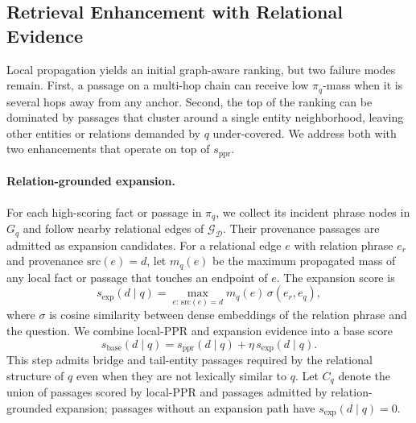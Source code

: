 \subsection{Retrieval Enhancement with Relational Evidence}
\label{sec:method:enhancement}

Local propagation yields an initial graph-aware ranking, but two failure
modes remain. First, a passage on a multi-hop chain can receive low
$\pi_q$-mass when it is several hops away from any anchor. Second, the
top of the ranking can be dominated by passages that cluster around a
single entity neighborhood, leaving other entities or relations demanded
by $q$ under-covered. We address both with two enhancements that operate
on top of $s_{\mathrm{ppr}}$.

\paragraph{Relation-grounded expansion.}
For each high-scoring fact or passage in $\pi_q$, we collect its
incident phrase nodes in $G_q$ and follow nearby relational edges of
$\mathcal{G}_{\mathcal{D}}$. Their provenance passages are admitted as
expansion candidates. For a relational edge $e$ with relation phrase
$e_r$ and provenance $\mathrm{src}(e)=d$, let $m_q(e)$ be the maximum
propagated mass of any local fact or passage that touches an endpoint of
$e$. The expansion score is
\begin{equation}
\label{eq:expansion-score}
s_{\mathrm{exp}}(d \mid q)
=
\max_{e:\,\mathrm{src}(e)=d}
m_q(e)\,\sigma(e_r,e_q),
\end{equation}
where $\sigma$ is cosine similarity between dense embeddings of the
relation phrase and the question. We combine local-PPR and expansion
evidence into a base score
\begin{equation}
\label{eq:base-score}
s_{\mathrm{base}}(d \mid q)
=
s_{\mathrm{ppr}}(d \mid q)
+
\eta\,s_{\mathrm{exp}}(d \mid q).
\end{equation}
This step admits bridge and tail-entity passages required by the
relational structure of $q$ even when they are not lexically similar to
$q$. Let $C_q$ denote the union of passages scored by local-PPR and
passages admitted by relation-grounded expansion; passages without an
expansion path have $s_{\mathrm{exp}}(d \mid q)=0$.

